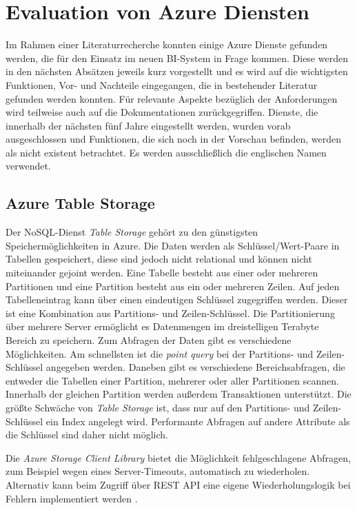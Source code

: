 \section{Evaluation von Azure Diensten} \label{sec:evaluation}
Im Rahmen einer Literaturrecherche konnten einige Azure Dienste gefunden werden, die für den Einsatz im neuen BI-System in Frage kommen. Diese werden in den nächsten Absätzen jeweils kurz vorgestellt und es wird auf die wichtigsten Funktionen, Vor- und Nachteile eingegangen, die in bestehender Literatur gefunden werden konnten. Für relevante Aspekte bezüglich der Anforderungen wird teilweise auch auf die Dokumentationen zurückgegriffen. Dienste, die innerhalb der nächsten fünf Jahre eingestellt werden, wurden vorab ausgeschlossen und Funktionen, die sich noch in der Vorschau befinden, werden als nicht existent betrachtet. Es werden ausschließlich die englischen Namen verwendet.


\subsection{Azure Table Storage} \label{sec:grundlagen:azure_dienste:tableStorage}
Der NoSQL-Dienst \textit{Table Storage} gehört zu den günstigsten Speichermöglichkeiten in Azure. Die Daten werden als Schlüssel/Wert-Paare in Tabellen gespeichert, diese sind jedoch nicht relational und können nicht miteinander gejoint werden. Eine Tabelle besteht aus einer oder mehreren Partitionen und eine Partition besteht aus ein oder mehreren Zeilen. Auf jeden Tabelleneintrag kann über einen eindeutigen Schlüssel zugegriffen werden. Dieser ist eine Kombination aus Partitions- und Zeilen-Schlüssel. Die Partitionierung über mehrere Server ermöglicht es Datenmengen im dreistelligen Terabyte Bereich zu speichern. Zum Abfragen der Daten gibt es verschiedene Möglichkeiten. Am schnellsten ist die \textit{point query} bei der Partitions- und Zeilen-Schlüssel angegeben werden. Daneben gibt es verschiedene Bereichsabfragen, die entweder die Tabellen einer Partition, mehrerer oder aller Partitionen scannen. Innerhalb der gleichen Partition werden außerdem Transaktionen unterstützt. Die größte Schwäche von \textit{Table Storage} ist, dass nur auf den Partitions- und Zeilen-Schlüssel ein Index angelegt wird. Performante Abfragen auf andere Attribute als die Schlüssel sind daher nicht möglich. 

Die \textit{Azure Storage Client Library} bietet die Möglichkeit fehlgeschlagene Abfragen, zum Beispiel wegen eines Server-Timeouts, automatisch zu wiederholen. Alternativ kann beim Zugriff über REST API eine eigene Wiederholungslogik bei Fehlern implementiert werden \cite{reagan_web_2018}. 

